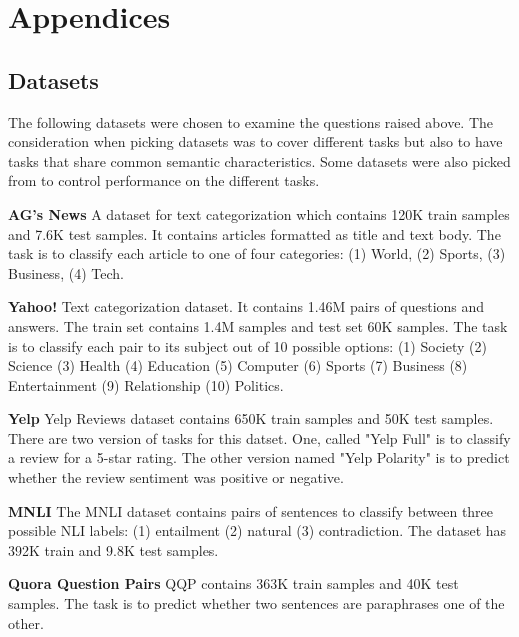 \documentclass[11pt,a4paper]{article}
\begin{document}



\appendix


\section{Appendices}
\label{sec:appendix}

\subsection{Datasets}
\label{apx:datasets}
The following datasets were chosen to examine the questions raised above.
The consideration when picking datasets was to cover different tasks but also to have tasks that share common semantic characteristics. 
Some datasets were also picked from \citet{schick2020exploiting} to control performance on the different tasks.

\vspace{8pt}
\noindent \textbf{AG's News} \quad
A dataset for text categorization which contains 120K train samples and 7.6K test samples.
It contains articles formatted as title and text body.
The task is to classify each article to one of four categories: (1) World, (2) Sports, (3) Business, (4) Tech.

\vspace{8pt}
\noindent \textbf{Yahoo!} \quad
Text categorization dataset. It contains 1.46M pairs of questions and answers.
The train set contains 1.4M samples and test set 60K samples.
The task is to classify each pair to its subject out of 10 possible options: (1) Society (2) Science (3) Health (4) Education (5) Computer (6) Sports (7) Business (8) Entertainment (9) Relationship (10) Politics.

\vspace{8pt}
\noindent \textbf{Yelp} \quad
Yelp Reviews dataset contains 650K train samples and 50K test samples.
There are two version of tasks for this datset.
One, called "Yelp Full" is to classify a review for a 5-star rating.
The other version named "Yelp Polarity" is to predict whether the review sentiment was positive or negative.

\vspace{8pt}
\noindent \textbf{MNLI} \quad
The MNLI dataset contains pairs of sentences to classify between three possible NLI labels: (1) entailment (2) natural (3) contradiction. 
The dataset has 392K train and 9.8K test samples.

\vspace{8pt}
\noindent \textbf{Quora Question Pairs} \quad
QQP contains 363K train samples and 40K test samples.
The task is to predict whether two sentences are paraphrases one of the other.
\end{document}
